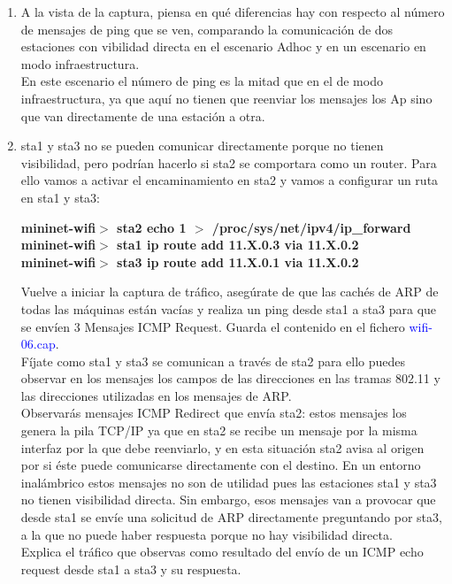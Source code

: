 \documentclass[12pt, a4paper]{report}
\begin{document}
\begin{enumerate}
	\item A la vista de la captura, piensa en qué diferencias hay con respecto al número de mensajes de ping
	que se ven, comparando la comunicación de dos estaciones con vibilidad directa en el escenario
	Adhoc y en un escenario en modo infraestructura.\\
	
	En este escenario el número de ping es la mitad que en el de modo infraestructura, ya que aquí no tienen que reenviar los mensajes los Ap sino que van directamente de una estación a otra.
	\item sta1 y sta3 no se pueden comunicar directamente porque no tienen visibilidad, pero podrían
	hacerlo si sta2 se comportara como un router. Para ello vamos a activar el encaminamiento en
	sta2 y vamos a configurar un ruta en sta1 y sta3:
	\begin{center}
		\textbf{mininet-wifi$>$ sta2 echo 1 $>$ /proc/sys/net/ipv4/ip\_forward\\
			mininet-wifi$>$ sta1 ip route add 11.X.0.3 via 11.X.0.2\\
			mininet-wifi$>$ sta3 ip route add 11.X.0.1 via 11.X.0.2}
	\end{center}
	Vuelve a iniciar la captura de tráfico, asegúrate de que las cachés de ARP de todas las máquinas
	están vacías y realiza un ping desde sta1 a sta3 para que se envíen 3 Mensajes ICMP Request.
	Guarda el contenido en el fichero \textcolor{blue}{wifi-06.cap}.\\
	
	Fíjate como sta1 y sta3 se comunican a través de sta2 para ello puedes observar en los mensajes
	los campos de las direcciones en las tramas 802.11 y las direcciones utilizadas en los mensajes de
	ARP.\\
	
	Observarás mensajes ICMP Redirect que envía sta2: estos mensajes los genera la pila TCP/IP
	ya que en sta2 se recibe un mensaje por la misma interfaz por la que debe reenviarlo, y en esta
	situación sta2 avisa al origen por si éste puede comunicarse directamente con el destino. En
	un entorno inalámbrico estos mensajes no son de utilidad pues las estaciones sta1 y sta3 no
	tienen visibilidad directa. Sin embargo, esos mensajes van a provocar que desde sta1 se envíe
	una solicitud de ARP directamente preguntando por sta3, a la que no puede haber respuesta
	porque no hay visibilidad directa.\\
	
	Explica el tráfico que observas como resultado del envío de un ICMP echo request desde sta1 a
	sta3 y su respuesta.\\
	

\end{enumerate}
\end{document}
